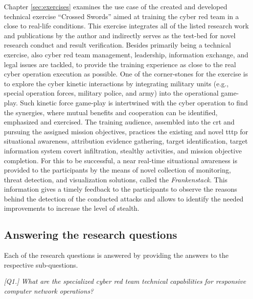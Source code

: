 Chapter \ref{sec:exercises} examines the use case of the created and developed technical exercise ``Crossed Swords'' aimed at training the cyber red team in a close to real-life conditions. This exercise integrates all of the listed research work and publications by the author and indirectly serves as the test-bed for novel research conduct and result verification. Besides primarily being a technical exercise, also cyber red team management, leadership, information exchange, and legal issues are tackled, to provide the training experience as close to the real cyber operation execution as possible. One of the corner-stones for the exercise is to explore the cyber kinetic interactions by integrating military units (e.g., special operation forces, military police, and army) into the operational game-play. Such kinetic force game-play is intertwined with the cyber operation to find the synergies, where mutual benefits and cooperation can be identified, emphasized and exercised.
The training audience, assembled into the \gls{crt} and pursuing the assigned mission objectives, practices the existing and novel \gls{tttp} for situational awareness, attribution evidence gathering, target identification, target information system covert infiltration, stealthy activities, and mission objective completion. For this to be successful, a near real-time situational awareness is provided to the participants by the means of novel collection of monitoring, threat detection, and visualization solutions, called the \textit{Frankenstack}. This information gives a timely feedback to the participants to observe the reasons behind the detection of the conducted attacks and allows to identify the needed improvements to increase the level of stealth.

\subsection{Answering the research questions}
Each of the research questions is answered by providing the answers to the respective sub-questions.

\textit{[Q1.] What are the specialized cyber red team technical capabilities for responsive computer network operations?}

